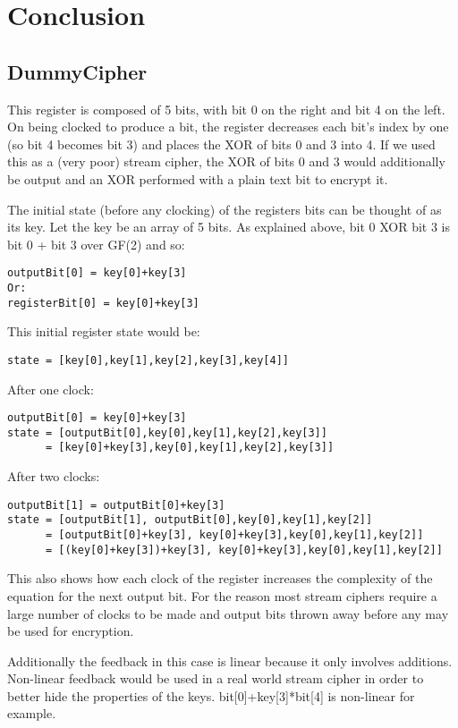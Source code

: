 \documentclass{report}
\begin{document}
\chapter{Conclusion}


\begin{appendices}
\chapter{DummyCipher}

This register is composed of 5 bits, with bit 0 on the right and bit 4 on the left. On being clocked to produce a bit, the register decreases each bit's index by one (so bit 4 becomes bit 3) and places the XOR of bits 0 and 3 into 4. If we used this as a (very poor) stream cipher, the XOR of bits 0 and 3 would additionally be output and an XOR performed with a plain text bit to encrypt it.

The initial state (before any clocking) of the registers bits can be thought of as its key. Let the key be an array of 5 bits. As explained above, bit 0 XOR bit 3 is bit 0 + bit 3 over GF(2) and so:
\begin{verbatim}
outputBit[0] = key[0]+key[3]
Or:
registerBit[0] = key[0]+key[3]
\end{verbatim}
This initial register state would be:
\begin{verbatim}
state = [key[0],key[1],key[2],key[3],key[4]]
\end{verbatim}
After one clock:
\begin{verbatim}
outputBit[0] = key[0]+key[3]
state = [outputBit[0],key[0],key[1],key[2],key[3]]
      = [key[0]+key[3],key[0],key[1],key[2],key[3]]
\end{verbatim}
After two clocks:
\begin{verbatim}
outputBit[1] = outputBit[0]+key[3]
state = [outputBit[1], outputBit[0],key[0],key[1],key[2]]
      = [outputBit[0]+key[3], key[0]+key[3],key[0],key[1],key[2]]
      = [(key[0]+key[3])+key[3], key[0]+key[3],key[0],key[1],key[2]]
\end{verbatim}
This also shows how each clock of the register increases the complexity of the equation for the next output bit. For the reason most stream ciphers require a large number of clocks to be made and output bits thrown away before any may be used for encryption.

Additionally the feedback in this case is linear because it only involves additions. Non-linear feedback would be used in a real world stream cipher in order to better hide the properties of the keys. bit[0]+key[3]*bit[4] is non-linear for example.

\end{appendices}
\end{document}
